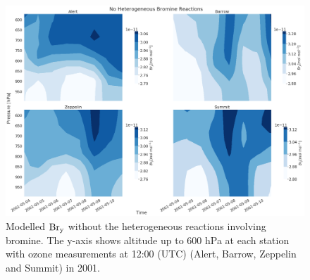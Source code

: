 \begin{figure}
    \centering
    \includegraphics[width = \linewidth]{Chapter6_Results/images/noBr_2001_bry.png}
    \caption{Modelled $\mathrm{Br_y}$ without the heterogeneous reactions involving bromine. The y-axis shows altitude up to 600 hPa at each station with ozone measurements at 12:00 (UTC) (Alert, Barrow, Zeppelin and Summit) in 2001.}
    \label{fig:vert_noBr_bry_2001}
\end{figure}